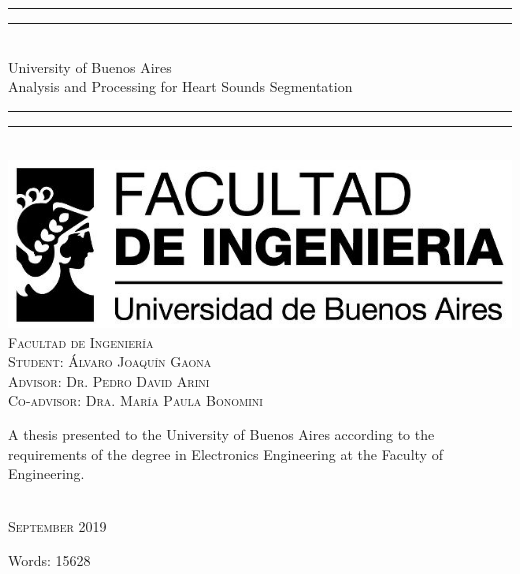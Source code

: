 \begin{titlepage}
\vspace*{5mm}
\begin{center}
  \rule[0.5ex]{\linewidth}{2pt}\vspace*{-\baselineskip}\vspace*{3.2pt}
  \rule[0.5ex]{\linewidth}{1pt}\\[\baselineskip]
  {\Huge University of Buenos Aires }\\[4mm]
  {\Large Analysis and Processing for Heart Sounds Segmentation}\\
  \rule[0.5ex]{\linewidth}{1pt}\vspace*{-\baselineskip}\vspace{3.2pt}
  \rule[0.5ex]{\linewidth}{2pt}\\
  \vspace{6.5mm}
  \includegraphics[scale=0.4]{images/logo-facu-caratula.jpg}\\
  \vspace{6mm}
  {\large %
  \textsc{Facultad de Ingeniería}}\\
  \vspace{6.5mm}
  {\large\textsc{Student: Álvaro Joaquín Gaona}}\\
  {\large\textsc{Advisor: Dr. Pedro David Arini}}\\
  {\large\textsc{Co-advisor: Dra. María Paula Bonomini}}\\
  \vspace{11mm}
  \begin{minipage}{14.1cm}
    A thesis presented to the University of Buenos Aires according to the requirements of the degree in Electronics
    Engineering at the Faculty of Engineering.
  \end{minipage}\\
  \vspace{9mm}
  {\large\textsc{September 2019}}
  \vspace{12mm}
\end{center}
\begin{flushright}
{\small Words: 15628}
\end{flushright}
\end{titlepage}
